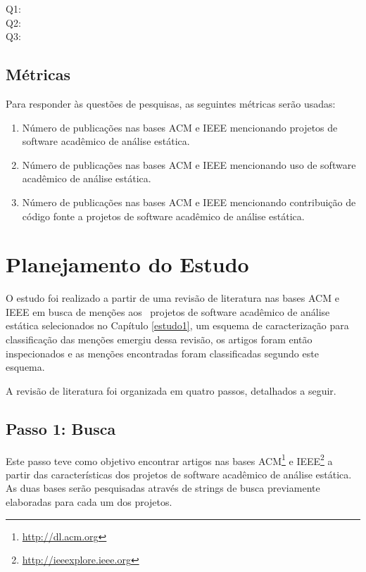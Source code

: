 \begin{description}
  \item [Q1:] \EstudoDoisQuestaoUm
  \item [Q2:] \EstudoDoisQuestaoDois
  \item [Q3:] \EstudoDoisQuestaoTres
\end{description}

\subsection{Métricas}

Para responder às questões de pesquisas, as seguintes métricas serão usadas:

\begin{enumerate}
  \item Número de publicações nas bases ACM e IEEE mencionando projetos de
    software acadêmico de análise estática.
  \item Número de publicações nas bases ACM e IEEE mencionando uso de
    software acadêmico de análise estática.
  \item Número de publicações nas bases ACM e IEEE mencionando contribuição de
    código fonte a projetos de software acadêmico de análise estática.
\end{enumerate}


\section{Planejamento do Estudo} \label{estudo2:planejamento} %

O estudo foi realizado a partir de uma revisão de literatura nas bases ACM e
IEEE em busca de menções aos \SoftwareCount \ projetos de software acadêmico de
análise estática selecionados no Capítulo \ref{estudo1}, um esquema de
caracterização para classificação das menções emergiu dessa revisão, os artigos
foram então inspecionados e as menções encontradas foram classificadas segundo
este esquema.

A revisão de literatura foi organizada em quatro passos, detalhados a seguir.

\subsection{Passo 1: Busca}

Este passo teve como objetivo encontrar artigos nas bases
ACM\footnote{\url{http://dl.acm.org}} e
IEEE\footnote{\url{http://ieeexplore.ieee.org}} a partir das características
dos projetos de software acadêmico de análise estática.
As duas bases serão pesquisadas através de strings de busca previamente
elaboradas para cada um dos projetos.

